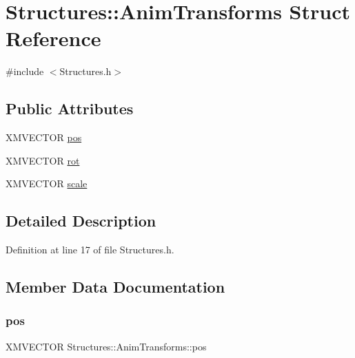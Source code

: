\hypertarget{struct_structures_1_1_anim_transforms}{}\section{Structures\+:\+:Anim\+Transforms Struct Reference}
\label{struct_structures_1_1_anim_transforms}


{\ttfamily \#include $<$Structures.\+h$>$}

\subsection*{Public Attributes}
\begin{DoxyCompactItemize}
\item 
X\+M\+V\+E\+C\+T\+OR \mbox{\hyperlink{struct_structures_1_1_anim_transforms_a25fc3a16bb365ff1d744e9da1684ceb0}{pos}}
\item 
X\+M\+V\+E\+C\+T\+OR \mbox{\hyperlink{struct_structures_1_1_anim_transforms_a997e756b9008a2ea9bc5a6dc32ee2722}{rot}}
\item 
X\+M\+V\+E\+C\+T\+OR \mbox{\hyperlink{struct_structures_1_1_anim_transforms_a09e4355cddfc9e2dfd7c0450fd83d138}{scale}}
\end{DoxyCompactItemize}


\subsection{Detailed Description}


Definition at line 17 of file Structures.\+h.



\subsection{Member Data Documentation}
\mbox{\label{struct_structures_1_1_anim_transforms_a25fc3a16bb365ff1d744e9da1684ceb0}} 
\subsubsection{\texorpdfstring{pos}{pos}}
{\footnotesize\ttfamily X\+M\+V\+E\+C\+T\+OR Structures\+::\+Anim\+Transforms\+::pos}



